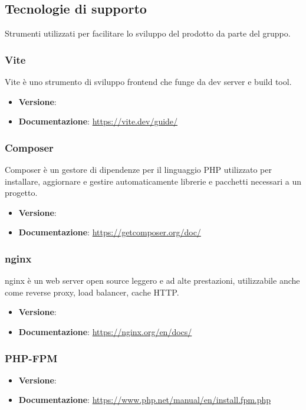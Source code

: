 \documentclass[a4paper,10pt]{article}
\begin{document}
\subsection{Tecnologie di supporto}
Strumenti utilizzati per facilitare lo sviluppo del prodotto da parte del gruppo.

\subsubsection{Vite}
Vite è uno strumento di sviluppo frontend che funge da dev server e build tool.
\begin{itemize}
    \item \textbf{Versione}:
    \item \textbf{Documentazione}: \url{https://vite.dev/guide/}
\end{itemize}

\subsubsection{Composer}
Composer è un gestore di dipendenze per il linguaggio PHP utilizzato per installare, aggiornare e gestire automaticamente librerie e pacchetti necessari a un progetto.
\begin{itemize}
    \item \textbf{Versione}:
    \item \textbf{Documentazione}: \url{https://getcomposer.org/doc/}
\end{itemize}

\subsubsection{nginx}
nginx è un web server open source leggero e ad alte prestazioni, utilizzabile anche come reverse proxy, load balancer, cache HTTP.
\begin{itemize}
    \item \textbf{Versione}:
    \item \textbf{Documentazione}: \url{https://nginx.org/en/docs/}
\end{itemize}

\subsubsection{PHP-FPM}

\begin{itemize}
    \item \textbf{Versione}:
    \item \textbf{Documentazione}: \url{https://www.php.net/manual/en/install.fpm.php}
\end{itemize}
\end{document}
